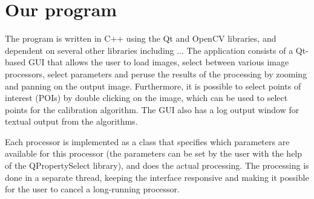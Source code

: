 \section{Our program}
\label{sec:prog}
The program is written in C++ using the Qt and OpenCV libraries, and
dependent on several other libraries including ...
The application consists of a Qt-based GUI that allows the user to load
images, select between various image processors, select parameters and
peruse the results of the processing by zooming and panning on the
output image. Furthermore, it is possible to select points of interest
(POIs) by double clicking on the image, which can be used to select
points for the calibration algorithm. The GUI also has a log output
window for textual output from the algorithms.

Each processor is implemented as a class that specifies which
parameters are available for this processor (the parameters can be set
by the user with the help of the QPropertySelect library), and does
the actual processing. The processing is done in a separate thread, keeping the interface responsive and making it possible for the user to
cancel a long-running processor.




